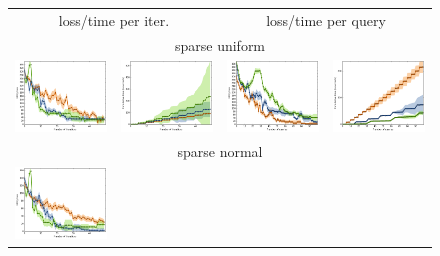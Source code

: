 \documentclass{article}
\renewcommand\[{\begin{equation}}
\renewcommand\]{\end{equation}}
\begin{document}
\begin{figure}
    \centering
    {\footnotesize
    \begin{tabular}{cccc}
        \hline
        \multicolumn{2}{c}{{\sc loss/time per iter.}} &
        \multicolumn{2}{c}{{\sc loss/time per query}}
        \\
        \multicolumn{4}{c}{{\sc sparse uniform}}
        \\
        \includegraphics[width=10em]{figures/pc_with_costs_uniform_sparse_per_iter_loss} &
        \includegraphics[width=10em]{figures/pc_with_costs_uniform_sparse_per_iter_time} &
        \includegraphics[width=10em]{figures/pc_with_costs_uniform_sparse_per_query_loss} &
        \includegraphics[width=10em]{figures/pc_with_costs_uniform_sparse_per_query_time}
        \\
        \hline
        \multicolumn{4}{c}{{\sc sparse normal}}
        \\
        \includegraphics[width=10em]{figures/pc_with_costs_normal_sparse_per_iter_loss} &

\end{tabular}}
\end{figure}
\end{document}
